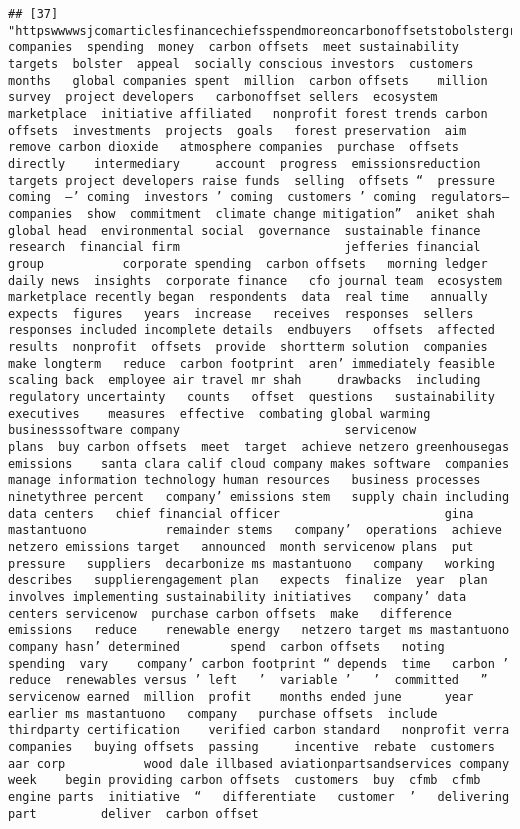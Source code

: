 \documentclass[
]{article}
\begin{document}
\begin{verbatim}
## [37] "httpswwwwsjcomarticlesfinancechiefsspendmoreoncarbonoffsetstobolstergreencredentials companies  spending  money  carbon offsets  meet sustainability targets  bolster  appeal  socially conscious investors  customers     months   global companies spent  million  carbon offsets    million        survey  project developers   carbonoffset sellers  ecosystem marketplace  initiative affiliated   nonprofit forest trends carbon offsets  investments  projects  goals   forest preservation  aim  remove carbon dioxide   atmosphere companies  purchase  offsets  directly    intermediary     account  progress  emissionsreduction targets project developers raise funds  selling  offsets “  pressure coming  —’ coming  investors ’ coming  customers ’ coming  regulators— companies  show  commitment  climate change mitigation”  aniket shah global head  environmental social  governance  sustainable finance research  financial firm                       jefferies financial group           corporate spending  carbon offsets   morning ledger  daily news  insights  corporate finance   cfo journal team  ecosystem marketplace recently began  respondents  data  real time   annually  expects  figures   years  increase   receives  responses  sellers   responses included incomplete details  endbuyers   offsets  affected  results  nonprofit  offsets  provide  shortterm solution  companies    make longterm   reduce  carbon footprint  aren’ immediately feasible   scaling back  employee air travel mr shah     drawbacks  including regulatory uncertainty   counts   offset  questions   sustainability executives    measures  effective  combating global warming   businesssoftware company                       servicenow          plans  buy carbon offsets  meet  target  achieve netzero greenhousegas emissions    santa clara calif cloud company makes software  companies   manage information technology human resources   business processes ninetythree percent   company’ emissions stem   supply chain including data centers   chief financial officer                       gina mastantuono           remainder stems   company’  operations  achieve  netzero emissions target   announced  month servicenow plans  put pressure   suppliers  decarbonize ms mastantuono   company   working    describes   supplierengagement plan   expects  finalize  year  plan involves implementing sustainability initiatives   company’ data centers servicenow  purchase carbon offsets  make   difference   emissions   reduce    renewable energy   netzero target ms mastantuono   company hasn’ determined       spend  carbon offsets   noting  spending  vary    company’ carbon footprint “ depends  time   carbon ’    reduce  renewables versus ’ left   ’  variable ’   ’  committed   ”   servicenow earned  million  profit    months ended june      year earlier ms mastantuono   company   purchase offsets  include  thirdparty certification    verified carbon standard   nonprofit verra  companies   buying offsets  passing     incentive  rebate  customers                        aar corp           wood dale illbased aviationpartsandservices company   week    begin providing carbon offsets  customers  buy  cfmb  cfmb engine parts  initiative  “   differentiate   customer  ’   delivering   part         deliver  carbon offset       
\end{verbatim}
\end{document}
